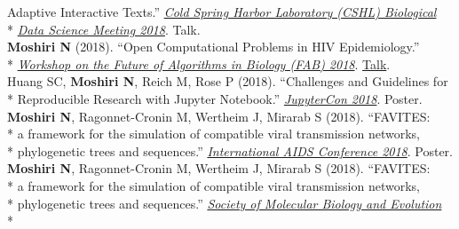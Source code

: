 \documentclass[margin,line]{res}
\begin{document}
\begin{resume}
\hspace*{9mm} Adaptive Interactive Texts.'' \href{http://meetings.cshl.edu/meetings.aspx?meet=DATA&year=18}{\textit{Cold Spring Harbor Laboratory (CSHL) Biological}}\\*\vspace{2mm}
\hspace*{8mm} \href{http://meetings.cshl.edu/meetings.aspx?meet=DATA&year=18}{\textit{Data Science Meeting 2018}}. Talk.\\
\hspace*{4mm} \textbf{Moshiri N} (2018). ``Open Computational Problems in HIV Epidemiology.''\\*\vspace{2mm}
\hspace*{8mm} \href{http://fab2018.cbd.cmu.edu/}{\textit{Workshop on the Future of Algorithms in Biology (FAB) 2018}}. \href{https://youtu.be/ENKBbV_30kk}{Talk}.\\
\hspace*{4mm} Huang SC, \textbf{Moshiri N}, Reich M, Rose P (2018). ``Challenges and Guidelines for\\*\vspace{2mm}
\hspace*{8mm} Reproducible Research with Jupyter Notebook.'' \href{https://conferences.oreilly.com/jupyter/jup-ny}{\textit{JupyterCon 2018}}. Poster.\\
\hspace*{4mm} \textbf{Moshiri N}, Ragonnet-Cronin M, Wertheim J, Mirarab S (2018). ``FAVITES:\\*
\hspace*{9mm} a framework for the simulation of compatible viral transmission networks,\\*\vspace{2mm}
\hspace*{8mm} phylogenetic trees and sequences.'' \href{https://www.aids2018.org/}{\textit{International AIDS Conference 2018}}. Poster.\\
\hspace*{4mm} \textbf{Moshiri N}, Ragonnet-Cronin M, Wertheim J, Mirarab S (2018). ``FAVITES:\\*
\hspace*{9mm} a framework for the simulation of compatible viral transmission networks,\\*
\hspace*{9mm} phylogenetic trees and sequences.'' \href{https://smbe.org/smbe/SMBE2018Meeting/}{\textit{Society of Molecular Biology and Evolution}}\\*\vspace{2mm}

\end{resume}
\end{document}
